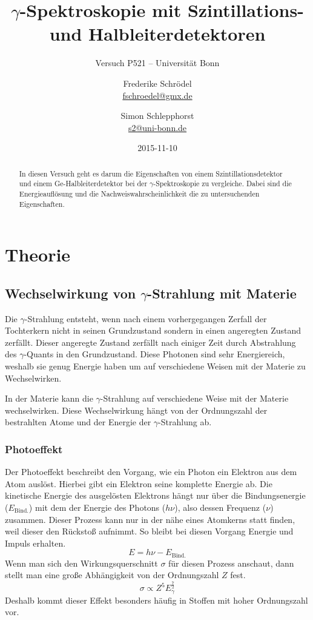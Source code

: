 \documentclass[11pt, ngerman, fleqn, DIV=15, headinclude, BCOR=2cm]{scrreprt}
\title{$\gamma$-Spektroskopie mit Szintillations- und Halbleiterdetektoren}
\subtitle{Versuch P521 -- Universität Bonn}
\author{
	Frederike Schrödel \\
	\small{\href{mailto:fschroedel@gmx.de}{fschroedel@gmx.de}}
	\and
	Simon Schlepphorst \\
	\small{\href{mailto:s2@uni-bonn.de}{s2@uni-bonn.de}}
}
\date{2015-11-10}
\begin{document}
\maketitle

\begin{abstract}
In diesen Versuch geht es darum die Eigenschaften von einem
Szintillationsdetektor und einem Ge-Halbleiterdetektor bei der
$\gamma$-Spektroskopie zu vergleiche.
Dabei sind die Energieauflösung und die Nachweiswahrscheinlichkeit die
zu untersuchenden Eigenschaften.
\end{abstract}


\tableofcontents

\chapter{Theorie}

\section{Wechselwirkung von $\gamma$-Strahlung mit Materie}
Die $\gamma$-Strahlung entsteht, wenn nach einem vorhergegangen Zerfall der
Tochterkern nicht in seinen Grundzustand sondern in einen angeregten Zustand
zerfällt.
Dieser angeregte Zustand zerfällt nach einiger Zeit durch Abstrahlung des
$\gamma$-Quants in den Grundzustand. Diese Photonen sind sehr Energiereich,
weshalb sie genug Energie haben um auf verschiedene Weisen mit der Materie zu
Wechselwirken.

In der Materie kann die $\gamma$-Strahlung auf verschiedene Weise mit der
Materie wechselwirken. 
Diese Wechselwirkung hängt von der Ordnungszahl der bestrahlten Atome und der Energie
der $\gamma$-Strahlung ab.

\subsection{Photoeffekt}
Der Photoeffekt beschreibt den Vorgang, wie ein Photon ein Elektron aus dem
Atom auslöst. 
Hierbei gibt ein Elektron seine komplette Energie ab.
Die kinetische Energie des ausgelösten Elektrons hängt nur über die
Bindungsenergie ($E_\text{Bind.}$) mit dem der Energie des Photons ($h\nu$), also dessen Frequenz ($\nu$) zusammen.
Dieser Prozess kann nur in der nähe eines Atomkerns statt finden, weil dieser
den Rückstoß aufnimmt.
So bleibt bei diesen Vorgang Energie und Impuls erhalten. 
\[ 
    E = h\nu - E_\text{Bind.}
\]
Wenn man sich den Wirkungsquerschnitt $\sigma$ für diesen Prozess anschaut,
dann stellt man eine große Abhängigkeit von der Ordnungszahl $Z$ fest.
\[
    \sigma \propto Z^5 E_\gamma^{\frac 72}
\]
Deshalb kommt dieser Effekt besonders häufig in Stoffen mit hoher Ordnungszahl
vor.
\end{document}
